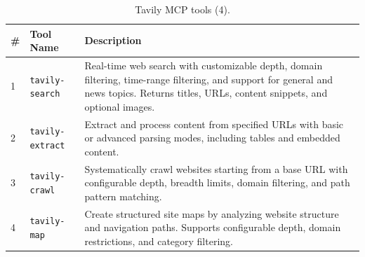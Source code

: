 \begin{table}[!h]
\begin{subtable}{\textwidth}
\centering
\caption{Tavily MCP tools (4).}
\label{tab:tools-tavily}
\small
\begin{tabular}{@{}llp{8.5cm}@{}}
\toprule
\textbf{\#} & \textbf{Tool Name} & \textbf{Description} \\
\midrule
1  & \texttt{tavily-search}  & Real-time web search with customizable depth, domain filtering, time-range filtering, and support for general and news topics. Returns titles, URLs, content snippets, and optional images. \\
2  & \texttt{tavily-extract} & Extract and process content from specified URLs with basic or advanced parsing modes, including tables and embedded content. \\
3  & \texttt{tavily-crawl}   & Systematically crawl websites starting from a base URL with configurable depth, breadth limits, domain filtering, and path pattern matching. \\
4  & \texttt{tavily-map}     & Create structured site maps by analyzing website structure and navigation paths. Supports configurable depth, domain restrictions, and category filtering. \\
\bottomrule
\end{tabular}
\end{subtable}

\end{table}

\clearpage
